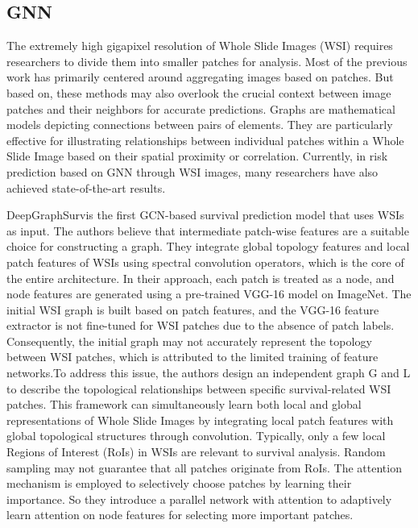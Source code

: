 \documentclass[journal,twoside,web]{ieeecolor}
\begin{document}
\subsection{GNN}
The extremely high gigapixel resolution of Whole Slide Images (WSI) requires researchers to divide them into smaller patches for analysis. Most of the previous work has primarily centered around aggregating images based on patches. But based on\cite{levy2020topological}, these methods may also overlook the crucial context between image patches and their neighbors for accurate predictions. Graphs are mathematical models depicting connections between pairs of elements. They are particularly effective for illustrating relationships between individual patches within a Whole Slide Image based on their spatial proximity or correlation. Currently, in risk prediction based on GNN through WSI images, many researchers have also achieved state-of-the-art results.

DeepGraphSurv\cite{li2018graph}is the first GCN-based survival prediction model that uses WSIs as input. The authors believe that intermediate patch-wise features are a suitable choice for constructing a graph. They integrate global topology features and local patch features of WSIs using spectral convolution operators, which is the core of the entire architecture. In their approach, each patch is treated as a node, and node features are generated using a pre-trained VGG-16 model on ImageNet. The initial WSI graph is built based on patch features, and the VGG-16 feature extractor is not fine-tuned for WSI patches due to the absence of patch labels. Consequently, the initial graph may not accurately represent the topology between WSI patches, which is attributed to the limited training of feature networks.To address this issue, the authors design an independent graph G and  L to describe the topological relationships between specific survival-related WSI patches. This framework can simultaneously learn both local and global representations of Whole Slide Images by integrating local patch features with global topological structures through convolution. Typically, only a few local Regions of Interest (RoIs) in WSIs are relevant to survival analysis. Random sampling may not guarantee that all patches originate from RoIs. The attention mechanism is employed to selectively choose patches by learning their importance. So they introduce a parallel network with attention to adaptively learn attention on node features for selecting more important patches.
\end{document}
